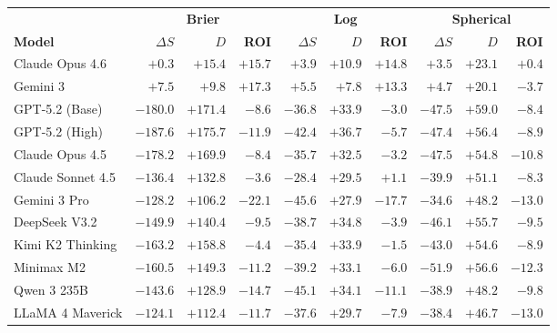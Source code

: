 \begin{tabular}{l *{3}{rrr}}
\toprule
& \multicolumn{3}{c}{\textbf{Brier}} & \multicolumn{3}{c}{\textbf{Log}} & \multicolumn{3}{c}{\textbf{Spherical}} \\
\cmidrule(lr){2-4} \cmidrule(lr){5-7} \cmidrule(lr){8-10}
\textbf{Model} & $\Delta S$ & $D$ & \textbf{ROI} & $\Delta S$ & $D$ & \textbf{ROI} & $\Delta S$ & $D$ & \textbf{ROI} \\
\midrule
Claude Opus 4.6    & $+0.3$ & $+15.4$ & $+15.7$ & $+3.9$ & $+10.9$ & $+14.8$ & $+3.5$ & $+23.1$ & $+0.4$ \\
Gemini 3           & $+7.5$ & $+9.8$ & $+17.3$ & $+5.5$ & $+7.8$ & $+13.3$ & $+4.7$ & $+20.1$ & $-3.7$ \\
GPT-5.2 (Base)     & $-180.0$ & $+171.4$ & $-8.6$ & $-36.8$ & $+33.9$ & $-3.0$ & $-47.5$ & $+59.0$ & $-8.4$ \\
GPT-5.2 (High)     & $-187.6$ & $+175.7$ & $-11.9$ & $-42.4$ & $+36.7$ & $-5.7$ & $-47.4$ & $+56.4$ & $-8.9$ \\
Claude Opus 4.5    & $-178.2$ & $+169.9$ & $-8.4$ & $-35.7$ & $+32.5$ & $-3.2$ & $-47.5$ & $+54.8$ & $-10.8$ \\
Claude Sonnet 4.5  & $-136.4$ & $+132.8$ & $-3.6$ & $-28.4$ & $+29.5$ & $+1.1$ & $-39.9$ & $+51.1$ & $-8.3$ \\
Gemini 3 Pro       & $-128.2$ & $+106.2$ & $-22.1$ & $-45.6$ & $+27.9$ & $-17.7$ & $-34.6$ & $+48.2$ & $-13.0$ \\
DeepSeek V3.2      & $-149.9$ & $+140.4$ & $-9.5$ & $-38.7$ & $+34.8$ & $-3.9$ & $-46.1$ & $+55.7$ & $-9.5$ \\
Kimi K2 Thinking   & $-163.2$ & $+158.8$ & $-4.4$ & $-35.4$ & $+33.9$ & $-1.5$ & $-43.0$ & $+54.6$ & $-8.9$ \\
Minimax M2         & $-160.5$ & $+149.3$ & $-11.2$ & $-39.2$ & $+33.1$ & $-6.0$ & $-51.9$ & $+56.6$ & $-12.3$ \\
Qwen 3 235B        & $-143.6$ & $+128.9$ & $-14.7$ & $-45.1$ & $+34.1$ & $-11.1$ & $-38.9$ & $+48.2$ & $-9.8$ \\
LLaMA 4 Maverick   & $-124.1$ & $+112.4$ & $-11.7$ & $-37.6$ & $+29.7$ & $-7.9$ & $-38.4$ & $+46.7$ & $-13.0$ \\
\bottomrule
\end{tabular}
